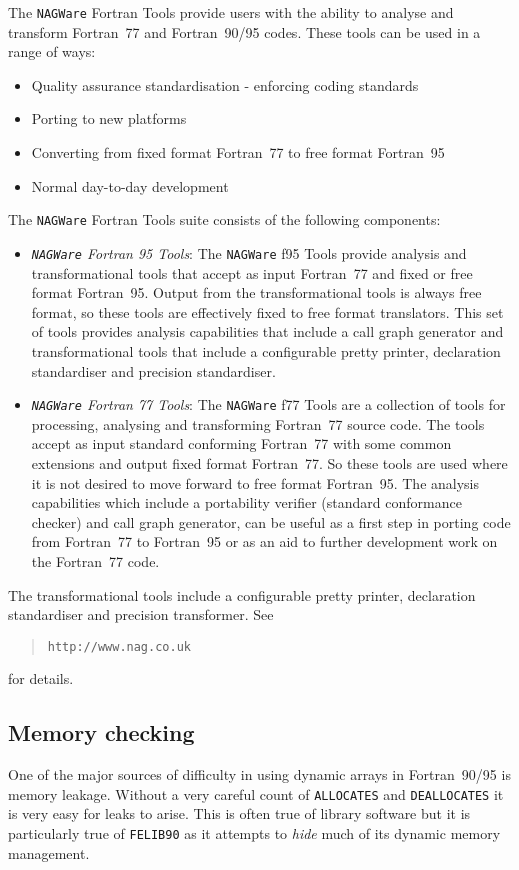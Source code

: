 \documentclass[a4paper,titlepage,11pt]{article}
\begin{document}
The {\tt NAGWare} Fortran Tools provide users with the ability to analyse and transform Fortran~77 and Fortran~90/95 codes.  These tools can be used in a range of ways: 
\begin{itemize}
	\item Quality assurance standardisation - enforcing coding standards 
	\item Porting to new platforms 
	\item Converting from fixed format Fortran~77 to free format Fortran~95 
	\item Normal day-to-day development 
\end{itemize}
The {\tt NAGWare} Fortran Tools suite consists of the following components: 
\begin{itemize}
	\item {\it {\tt NAGWare} Fortran 95 Tools}:
The {\tt NAGWare} f95 Tools provide analysis and transformational tools that accept as input 
Fortran~77 and fixed or free format Fortran~95. Output from the transformational tools is 
always free format, so these tools are effectively fixed to free format translators. 
This set of tools provides analysis capabilities that include a call graph generator and transformational tools that include a configurable pretty printer, declaration standardiser and precision standardiser. 
  \item{\it{\tt NAGWare} Fortran 77 Tools}:
The {\tt NAGWare} f77 Tools are a collection of tools for processing, analysing and transforming 
Fortran~77 source code. The tools accept as input standard conforming Fortran~77 with some common extensions and output fixed format Fortran~77. So these tools are used where it is not desired to move forward to free format Fortran~95. 
The analysis capabilities which include a portability verifier (standard conformance checker) and 
call graph generator, can be useful as a first step in porting code from Fortran~77 to Fortran~95 
or as an aid to further development work on the Fortran~77 code.
\end{itemize} 
The transformational tools include a configurable pretty printer, declaration standardiser and precision transformer.  See 
\begin{quote}
{\tt http://www.nag.co.uk}
\end{quote}
 for details.

\subsection{Memory checking}
One of the major sources of difficulty in using dynamic arrays in Fortran~90/95
is memory leakage. Without a very careful count of {\tt ALLOCATES} and {\tt DEALLOCATES} 
it is very easy for leaks to arise. This is often true of library software but it is
particularly true of {\tt FELIB90} as it attempts to {\it hide} much of its dynamic memory
management.
\end{document}
